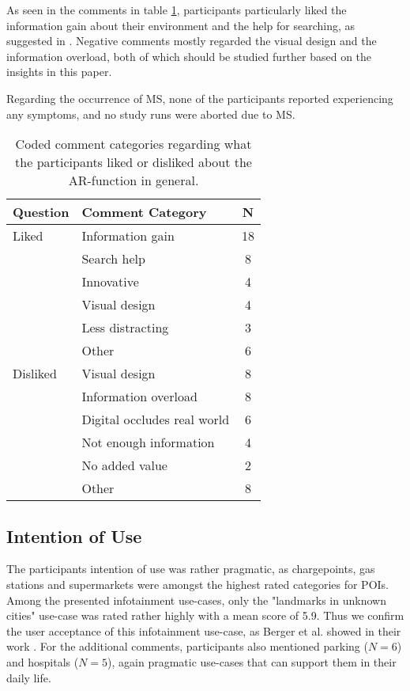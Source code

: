 As seen in the comments in table \ref{tab:AcceptanceComments}, participants particularly liked the information gain about their environment and the help for searching, as suggested in \cite{BergerGridStudyInCarPassenger2021}. Negative comments mostly regarded the visual design and the information overload, both of which should be studied further based on the insights in this paper.

Regarding the occurrence of MS, none of the participants reported experiencing any symptoms, and no study runs were aborted due to MS.


\begin{table}[h]
    \centering
    \caption{Coded comment categories regarding what the participants liked or disliked about the AR-function in general.}
    \label{tab:AcceptanceComments}
    \begin{tabular}{l|l|c}
    \toprule
    \textbf{Question} & \textbf{Comment Category}  & \textbf{N}  \\
    \midrule
    Liked     & Information gain            & 18 \\
             & Search help                  & 8  \\
             & Innovative                   & 4  \\
             & Visual design                & 4  \\
             & Less distracting             & 3  \\
             & Other                        & 6  \\

    \midrule
    Disliked & Visual design                & 8  \\
             & Information overload         & 8  \\
             & Digital occludes real world  & 6  \\
             & Not enough information       & 4  \\
             & No added value               & 2  \\
             & Other                        & 8  \\
    \bottomrule  
    \end{tabular}
\end{table}

\subsection{Intention of Use}
\label{sec:intentionOfUse}
The participants intention of use was rather pragmatic, as chargepoints, gas stations and supermarkets were amongst the highest rated categories for POIs. Among the presented infotainment use-cases, only the "landmarks in unknown cities" use-case was rated rather highly with a mean score of 5.9. Thus we confirm the user acceptance of this infotainment use-case, as Berger et al. showed in their work \cite{BergerRearSeatDoor21}. For the additional comments, participants also mentioned parking ($N = 6$) and hospitals ($N = 5$), again pragmatic use-cases that can support them in their daily life.


